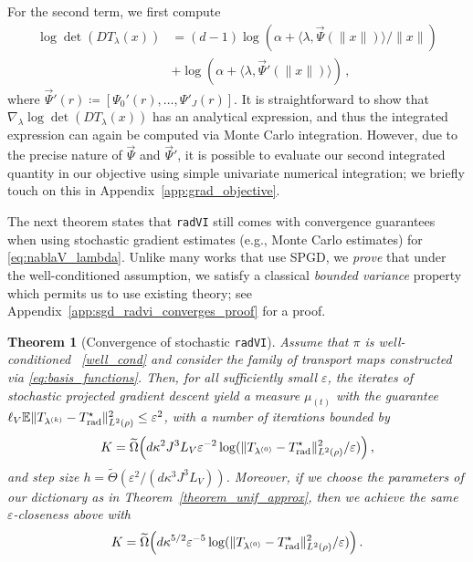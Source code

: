 \documentclass[twoside]{article}
\newcommand{\1}{\mathds{1}}
\newcommand{\eps}{\varepsilon}
\newcommand*{\E}{\mathbb E}
\newcommand*{\defeq}{\coloneqq}
\theoremstyle{plain}
\newtheorem{theorem}{Theorem}[section]
\theoremstyle{definition}
\theoremstyle{remark}
\renewcommand{\tilde}{\widetilde}
\begin{document}
For the second term, we first compute
\begin{align*}
    \log\det(DT_\lambda(x)) &= (d-1)\log(\alpha+\langle\lambda,\Vec{\Psi}(\|x\|)\rangle /\|x\|) \\
    & + \log(\alpha + \langle\lambda,\vec\Psi'(\|x\|)\rangle)\,,
\end{align*}
where $\Vec{\Psi}'(r) \defeq [\Psi_0'(r),\ldots,\Psi'_J(r)]$. It is straightforward to show that $\nabla_\lambda \log\det(DT_\lambda(x))$ has an analytical expression, and thus the integrated expression can again be computed via Monte Carlo integration. However, due to the precise nature of $\vec\Psi$ and $\vec\Psi'$, it is possible to evaluate our second integrated quantity in our objective using {simple univariate numerical integration}; we briefly touch on this in {Appendix~\ref{app:grad_objective}}.

The next theorem states that \texttt{radVI} still comes with convergence guarantees when using stochastic gradient estimates (e.g., Monte Carlo estimates) for \eqref{eq:nablaV_lambda}. Unlike many works that use SPGD, we \emph{prove} that under the well-conditioned assumption, we satisfy a classical \emph{bounded variance} property which permits us to use existing theory; see Appendix~\ref{app:sgd_radvi_converges_proof}
for a proof. 
\begin{theorem}[Convergence of stochastic \texttt{radVI}]\label{thm:sgd_radvi_converges}
    Assume that $\pi$ is well-conditioned ~\ref{well_cond} and consider the family of transport maps constructed via \eqref{eq:basis_functions}. Then, {for all sufficiently small $\eps$,} the iterates of stochastic projected gradient descent yield a measure $\mu_{(t)} $ with the guarantee ${\ell_V}\E\|T_{\lambda^{(k)}} - T_{\rm rad}^\star\|^2_{L^2(\rho)} \leq \eps^2$, with a number of iterations bounded by
    \begin{align*}
        K = \tilde\Omega \Bigl({d\kappa^2 J^3L_V}\eps^{-2}\log(\|T_{\lambda^{(0)}} - T_{\rm rad}^\star\|^2_{L^2(\rho)} /\eps)\Bigr)\,,
    \end{align*}
    and step size $h = \tilde\Theta(\eps^2/(d\kappa^3 J^3L_V))$. Moreover, if we choose the parameters of our dictionary as in Theorem~\ref{theorem_unif_approx}, then we achieve the same $\eps$-closeness above with
    \begin{align*}
        K = \tilde\Omega\Bigl({d\kappa^{5/2} }\eps^{-5}\log(\|T_{\lambda^{(0)}} - T_{\rm rad}^\star\|^2_{L^2(\rho)}/\eps)\Bigr)\,.
    \end{align*}
\end{theorem}
\end{document}
